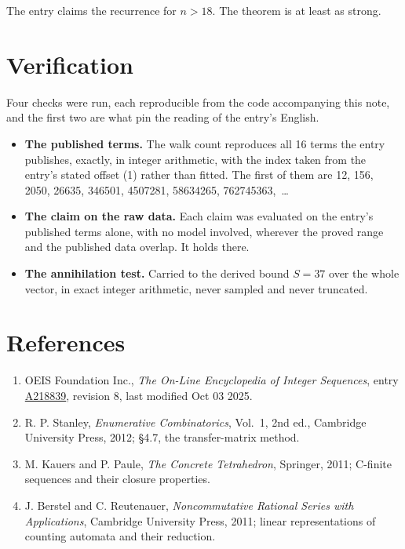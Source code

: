 \documentclass[11pt]{article}
\theoremstyle{definition}
\begin{document}
The entry claims the recurrence for $n > 18$. The theorem is at least as strong.

\section{Verification}

Four checks were run, each reproducible from the code accompanying this note, and the first two are what pin the reading of the entry's English.

\begin{itemize}

\item {\bfseries The published terms.} The walk count reproduces all 16 terms the entry publishes, exactly, in integer arithmetic, with the index taken from the entry's stated offset (1) rather than fitted. The first of them are 12, 156, 2050, 26635, 346501, 4507281, 58634265, 762745363,~\dots

\item {\bfseries The claim on the raw data.} Each claim was evaluated on the entry's published terms alone, with no model involved, wherever the proved range and the published data overlap. It holds there.

\item {\bfseries The annihilation test.} Carried to the derived bound $S = 37$ over the whole vector, in exact integer arithmetic, never sampled and never truncated.

\end{itemize}

\section{References}

\begin{enumerate}

\item OEIS Foundation Inc., \emph{The On-Line Encyclopedia of Integer Sequences}, entry \href{https://oeis.org/A218839}{A218839}, revision 8, last modified Oct 03 2025.

\item R. P. Stanley, \emph{Enumerative Combinatorics}, Vol.~1, 2nd ed., Cambridge University Press, 2012; \S4.7, the transfer-matrix method.

\item M. Kauers and P. Paule, \emph{The Concrete Tetrahedron}, Springer, 2011; C-finite sequences and their closure properties.

\item J. Berstel and C. Reutenauer, \emph{Noncommutative Rational Series with Applications}, Cambridge University Press, 2011; linear representations of counting automata and their reduction.

\end{enumerate}
\end{document}
